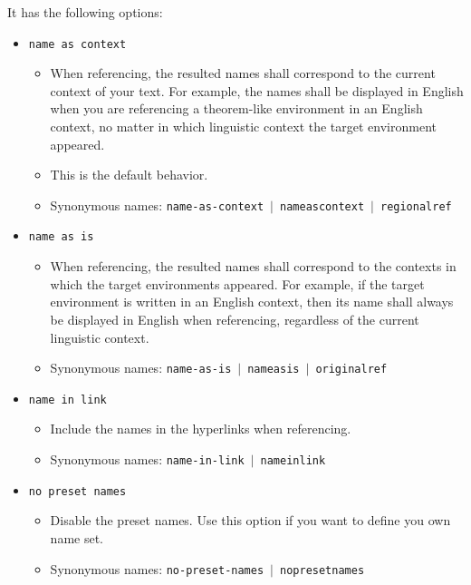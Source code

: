 \documentclass[classical]{einfart}
\newcommand{\packageoption}[1]{\textcolor{code-option}{\texttt{#1}}}
\begin{document}
\medskip
It has the following options:
\begin{itemize}[label=,leftmargin=1.25em,itemindent=-1.25em]
    \item \packageoption{name as context}
        \begin{itemize}
            \item When referencing, the resulted names shall correspond to the current context of your text. For example, the names shall be displayed in English when you are referencing a theorem-like environment in an English context, no matter in which linguistic context the target environment appeared.
            \item This is the default behavior.
            \item Synonymous names: \packageoption{name-as-context} \,$|$\, \packageoption{nameascontext} \,$|$\, \packageoption{regionalref}
        \end{itemize}
    \item \packageoption{name as is}
        \begin{itemize}
            \item When referencing, the resulted names shall correspond to the contexts in which the target environments appeared. For example, if the target environment is written in an English context, then its name shall always be displayed in English when referencing, regardless of the current linguistic context.
            \item Synonymous names: \packageoption{name-as-is} \,$|$\, \packageoption{nameasis} \,$|$\, \packageoption{originalref}
        \end{itemize}
    \item \packageoption{name in link}
        \begin{itemize}
            \item Include the names in the hyperlinks when referencing.
            \item Synonymous names: \packageoption{name-in-link} \,$|$\, \packageoption{nameinlink}
        \end{itemize}
    \item \packageoption{no preset names}
        \begin{itemize}
            \item Disable the preset names. Use this option if you want to define you own name set.
            \item Synonymous names: \packageoption{no-preset-names} \,$|$\, \packageoption{nopresetnames}
        \end{itemize}
\end{itemize}
\end{document}

